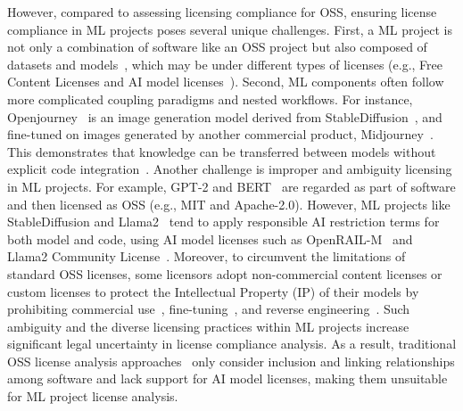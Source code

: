 However, compared to assessing licensing compliance for OSS, ensuring license compliance in ML projects poses several unique challenges. 
First, a ML project is not only a combination of software like an OSS project but also composed of datasets and models~\cite{han2021pre}, which may be under different types of licenses (e.g., Free Content Licenses and AI model licenses~\cite{contractor2022behavioral}).
Second, ML components often follow more complicated coupling paradigms and nested workflows. For instance, Openjourney~\cite{openjourney2023prompthero} is an image generation model derived from StableDiffusion~\cite{rombach2022high}, and fine-tuned on images generated by another commercial product, Midjourney~\cite{midjourney2023terms}.
This demonstrates that knowledge can be transferred between models without explicit code integration~\cite{you2021workshop}.
Another challenge is improper and ambiguity licensing in ML projects.
For example, GPT-2 and BERT~\cite{devlin2019bert} are regarded as part of software and then licensed as OSS (e.g., MIT and Apache-2.0).
However, ML projects like StableDiffusion and Llama2~\cite{touvron2023llama} tend to apply responsible AI restriction terms for both model and code, using AI model licenses such as OpenRAIL-M~\cite{contractor2022behavioral} and Llama2 Community License~\cite{meta2023llama2}.
Moreover, to circumvent the limitations of standard OSS licenses, some licensors adopt non-commercial content licenses or custom licenses to protect the Intellectual Property (IP) of their models by prohibiting commercial use~\cite{huang2022layoutlmv3}, fine-tuning~\cite{dreamlike2023}, and reverse engineering~\cite{goyal2022vision}.
Such ambiguity and the diverse licensing practices within ML projects  increase significant legal uncertainty in license compliance analysis.
As a result, traditional OSS license analysis approaches~\cite{ombredanne2020free, mathur2012empirical} only consider inclusion and linking relationships among software and lack support for AI model licenses, making them unsuitable for ML project license analysis.

